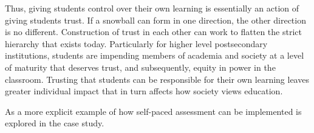Thus, giving students control over their own learning is essentially an action of giving students trust. If a snowball can form in one direction, the other direction is no different. Construction of trust in each other can work to flatten the strict hierarchy that exists today. Particularly for higher level postsecondary institutions, students are impending members of academia and society at a level of maturity that deserves trust, and subsequently, equity in power in the classroom. Trusting that students can be responsible for their own learning leaves greater individual impact that in turn affects how society views education.

As a more explicit example of how self-paced assessment can be implemented is explored in the case study.
